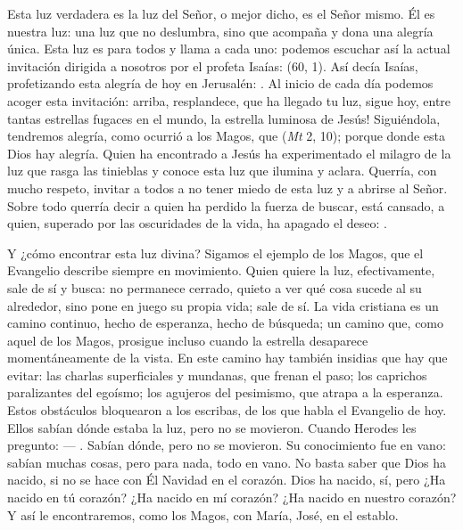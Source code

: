 \begin{body}
\begin{body}
{Esta luz verdadera es la luz del Señor, o mejor dicho, es el Señor mismo. Él es nuestra luz: una luz que no deslumbra, sino que acompaña y dona una alegría única. Esta luz es para todos y llama a cada uno: podemos escuchar así la actual invitación dirigida a nosotros por el profeta Isaías:  (60, 1). Así decía Isaías, profetizando esta alegría de hoy en Jerusalén: . Al inicio de cada día podemos acoger esta invitación: arriba, resplandece, que ha llegado tu luz, sigue hoy, entre tantas estrellas fugaces en el mundo, la estrella luminosa de Jesús! Siguiéndola, tendremos alegría, como ocurrió a los Magos, que  (\emph{Mt} 2, 10); porque donde esta Dios hay alegría. Quien ha encontrado a Jesús ha experimentado el milagro de la luz que rasga las tinieblas y conoce esta luz que ilumina y aclara. Querría, con mucho respeto, invitar a todos a no tener miedo de esta luz y a abrirse al Señor. Sobre todo querría decir a quien ha perdido la fuerza de buscar, está cansado, a quien, superado por las oscuridades de la vida, ha apagado el deseo: .

Y ¿cómo encontrar esta luz divina? Sigamos el ejemplo de los Magos, que el Evangelio describe siempre en movimiento. Quien quiere la luz, efectivamente, sale de sí y busca: no permanece cerrado, quieto a ver qué cosa sucede al su alrededor, sino pone en juego su propia vida; sale de sí. La vida cristiana es un camino continuo, hecho de esperanza, hecho de búsqueda; un camino que, como aquel de los Magos, prosigue incluso cuando la estrella desaparece momentáneamente de la vista. En este camino hay también insidias que hay que evitar: las charlas superficiales y mundanas, que frenan el paso; los caprichos paralizantes del egoísmo; los agujeros del pesimismo, que atrapa a la esperanza. Estos obstáculos bloquearon a los escribas, de los que habla el Evangelio de hoy. Ellos sabían dónde estaba la luz, pero no se movieron. Cuando Herodes les pregunto:  --- . Sabían dónde, pero no se movieron. Su conocimiento fue en vano: sabían muchas cosas, pero para nada, todo en vano. No basta saber que Dios ha nacido, si no se hace con Él Navidad en el corazón. Dios ha nacido, sí, pero ¿Ha nacido en tú corazón? ¿Ha nacido en mí corazón? ¿Ha nacido en nuestro corazón? Y así le encontraremos, como los Magos, con María, José, en el establo.

}
\end{body}
\end{body}
